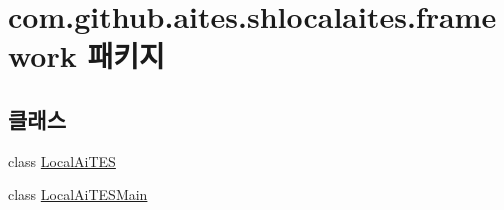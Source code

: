 \hypertarget{namespacecom_1_1github_1_1aites_1_1shlocalaites_1_1framework}{}\section{com.\+github.\+aites.\+shlocalaites.\+framework 패키지}
\label{namespacecom_1_1github_1_1aites_1_1shlocalaites_1_1framework}
\subsection*{클래스}
\begin{DoxyCompactItemize}
\item 
class \mbox{\hyperlink{classcom_1_1github_1_1aites_1_1shlocalaites_1_1framework_1_1_local_ai_t_e_s}{Local\+Ai\+T\+ES}}
\item 
class \mbox{\hyperlink{classcom_1_1github_1_1aites_1_1shlocalaites_1_1framework_1_1_local_ai_t_e_s_main}{Local\+Ai\+T\+E\+S\+Main}}
\end{DoxyCompactItemize}
